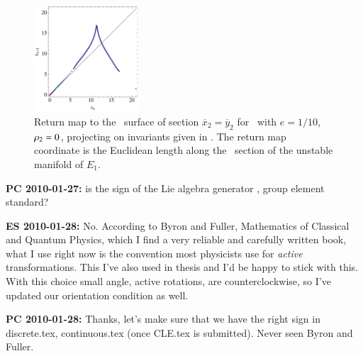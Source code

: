 \begin{figure}[ht]
\begin{center}
\includegraphics[width=0.35\textwidth,clip=true]{../figs/CLEinvRM}
\end{center}
\caption[Return map for Complex Lorenz flow]{
Return map to the \Poincare\ surface of section
$\overline{x}_2=\overline{y}_2$ for \cLe\ with $e=1/10$,
$\rho_2=0$, projecting on invariants given in
. The return map coordinate is the
Euclidean length along the \Poincare\ section of the unstable
manifold of $E_1$.
    }
\label{fig:CLEinvRM}
\end{figure}

{\bf PC 2010-01-27:}
is the sign of the Lie algebra generator
, group element standard?

{\bf ES 2010-01-28:}
    No. According
to Byron and Fuller, Mathematics of Classical and Quantum
Physics, which I find a very reliable and carefully written
book, what I use right now is the convention most physicists
use for \emph{active} transformations. This I've also used
in thesis and I'd be happy to stick with this. With this choice
small angle, active rotations, are counterclockwise, so I've updated
our orientation condition as well.

{\bf PC 2010-01-28:} Thanks, let's make sure that we have the
right sign in discrete.tex, continuous.tex (once CLE.tex is
submitted). Never seen Byron and Fuller.

